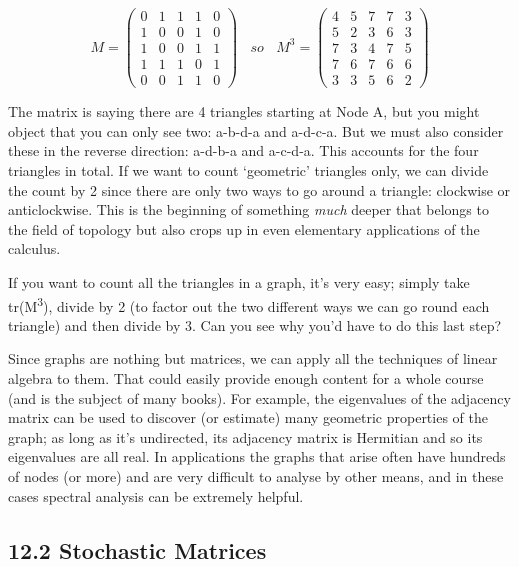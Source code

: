 \documentclass[oneside,english]{amsbook}
\numberwithin{section}{chapter}
\theoremstyle{plain}
\theoremstyle{definition}
\begin{document}
\[M = \begin{pmatrix}
	0 & 1 & 1 & 1 & 0 \\
	1 & 0 & 0 & 1 & 0 \\
	1 & 0 & 0 & 1 & 1 \\
	1 & 1 & 1 & 0 & 1 \\
	0 & 0 & 1 & 1 & 0
\end{pmatrix}\ \ \ \ so\ \ \ \ M^{3} = \begin{pmatrix}
	4 & 5 & 7 & 7 & 3 \\
	5 & 2 & 3 & 6 & 3 \\
	7 & 3 & 4 & 7 & 5 \\
	7 & 6 & 7 & 6 & 6 \\
	3 & 3 & 5 & 6 & 2
\end{pmatrix}\]

The matrix is saying there are 4 triangles starting at Node A, but you
might object that you can only see two: a-b-d-a and a-d-c-a. But we must
also consider these in the reverse direction: a-d-b-a and a-c-d-a. This
accounts for the four triangles in total. If we want to count
`geometric' triangles only, we can divide the count by 2 since there
are only two ways to go around a triangle: clockwise or anticlockwise.
This is the beginning of something \emph{much} deeper that belongs to
the field of topology but also crops up in even elementary applications
of the calculus.

If you want to count all the triangles in a graph, it's very easy;
simply take tr(M\textsuperscript{3}), divide by 2 (to factor out the two
different ways we can go round each triangle) and then divide by 3. Can
you see why you'd have to do this last step?

Since graphs are nothing but matrices, we can apply all the techniques
of linear algebra to them. That could easily provide enough content for
a whole course (and is the subject of many books). For example, the
eigenvalues of the adjacency matrix can be used to discover (or
estimate) many geometric properties of the graph; as long as it's
undirected, its adjacency matrix is Hermitian and so its eigenvalues are
all real. In applications the graphs that arise often have hundreds of
nodes (or more) and are very difficult to analyse by other means, and in
these cases spectral analysis can be extremely helpful.

\subsection{12.2 Stochastic Matrices}\label{stochastic-matrices}
\end{document}
